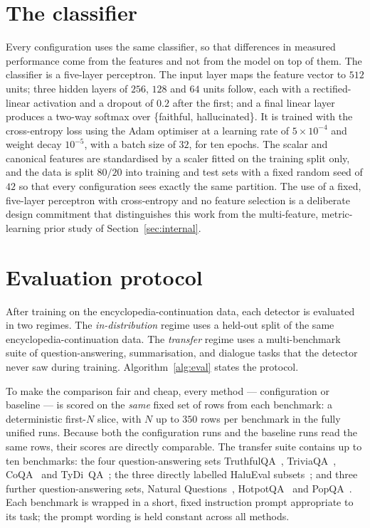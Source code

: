 \section{The classifier}
\label{sec:classifier}

Every configuration uses the same classifier, so that differences in measured performance
come from the features and not from the model on top of them. The classifier is a
five-layer perceptron. The input layer maps the feature vector to $512$ units; three hidden
layers of $256$, $128$ and $64$ units follow, each with a rectified-linear activation and a
dropout of $0.2$ after the first; and a final linear layer produces a two-way softmax over
\{faithful, hallucinated\}. It is trained with the cross-entropy loss using the Adam
optimiser at a learning rate of $5\times10^{-4}$ and weight decay $10^{-5}$, with a batch
size of $32$, for ten epochs.
The scalar and canonical features are standardised by a scaler fitted on the training
split only, and the data is split $80/20$ into training and test sets with a fixed random
seed of $42$ so that every configuration sees exactly the same partition. The use of a
fixed, five-layer perceptron with cross-entropy and no feature selection is a deliberate
design commitment that distinguishes this work from the multi-feature, metric-learning
prior study of Section~\ref{sec:internal}.

\section{Evaluation protocol}
\label{sec:protocol}

After training on the encyclopedia-continuation data, each detector is evaluated in two
regimes. The \emph{in-distribution} regime uses a held-out split of the same
encyclopedia-continuation data. The \emph{transfer} regime uses a multi-benchmark suite
of question-answering, summarisation, and dialogue tasks that the detector never saw
during training. Algorithm~\ref{alg:eval} states the protocol.

To make the comparison fair and cheap, every method --- configuration or baseline --- is
scored on the \emph{same} fixed set of rows from each benchmark: a deterministic first-$N$
slice, with $N$ up to $350$ rows per benchmark in the fully unified runs. Because both the
configuration runs and the baseline runs read the same rows, their scores are directly
comparable. The transfer suite contains up to ten benchmarks: the four
question-answering sets TruthfulQA~\cite{lin2022truthfulqa},
TriviaQA~\cite{joshi2017triviaqa}, CoQA~\cite{reddy2019coqa} and
TyDi~QA~\cite{clark2020tydiqa}; the three directly labelled HaluEval
subsets~\cite{li2023halueval}; and three further question-answering sets, Natural
Questions~\cite{kwiatkowski2019nq}, HotpotQA~\cite{yang2018hotpotqa} and
PopQA~\cite{mallen2023popqa}. Each benchmark is wrapped in a short, fixed instruction
prompt appropriate to its task; the prompt wording is held constant across all methods.

